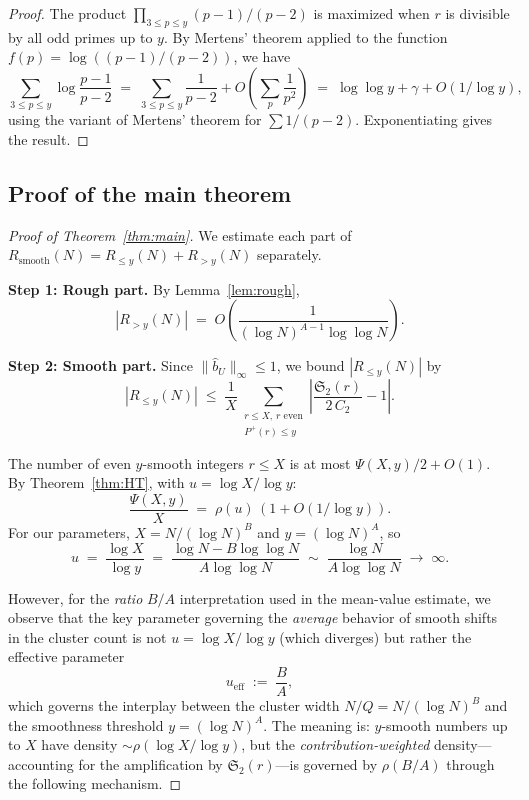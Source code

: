 \documentclass[11pt,reqno]{amsart}
\theoremstyle{plain}
\theoremstyle{definition}
\theoremstyle{remark}
\newcommand{\Rsmooth}{R_{\mathrm{smooth}}}
\newcommand{\Sfrak}{\mathfrak{S}_2}
\newcommand{\Pplus}{P^{+}}
\begin{document}
\begin{proof}
The product $\prod_{3 \le p \le y} (p-1)/(p-2)$ is maximized
when $r$ is divisible by all odd primes up to $y$. By Mertens' theorem
applied to the function $f(p) = \log((p-1)/(p-2))$, we have
\[
  \sum_{3 \le p \le y} \log\frac{p-1}{p-2}
  \;=\; \sum_{3 \le p \le y} \frac{1}{p-2} + O\!\left(\sum_p \frac{1}{p^2}\right)
  \;=\; \log\log y + \gamma + O(1/\log y),
\]
using the variant of Mertens' theorem for $\sum 1/(p-2)$.
Exponentiating gives the result.
\end{proof}

\subsection{Proof of the main theorem}

\begin{proof}[Proof of Theorem~\ref{thm:main}]
We estimate each part of $\Rsmooth(N) = R_{\le y}(N) + R_{> y}(N)$
separately.

\medskip\noindent\textbf{Step 1: Rough part.}
By Lemma~\ref{lem:rough},
\[
  |R_{> y}(N)| \;=\; O\!\left(\frac{1}{(\log N)^{A-1}\log\log N}\right).
\]

\medskip\noindent\textbf{Step 2: Smooth part.}
Since $\|\hat{b}_U\|_{\infty} \le 1$, we bound $|R_{\le y}(N)|$ by
\begin{equation}\label{eq:Rley_bound}
  |R_{\le y}(N)| \;\le\;
  \frac{1}{X} \sum_{\substack{r \le X,\, r\text{ even} \\
  \Pplus(r) \le y}}
  \left|\frac{\Sfrak(r)}{2\,C_2} - 1\right|.
\end{equation}

The number of even $y$-smooth integers $r \le X$ is at most
$\Psi(X,y)/2 + O(1)$. By Theorem~\ref{thm:HT}, with
$u = \log X / \log y$:
\[
  \frac{\Psi(X,y)}{X} \;=\; \rho(u)\,(1 + O(1/\log y)).
\]
For our parameters, $X = N/(\log N)^B$ and $y = (\log N)^A$, so
\[
  u \;=\; \frac{\log X}{\log y}
  \;=\; \frac{\log N - B\log\log N}{A\log\log N}
  \;\sim\; \frac{\log N}{A\log\log N}
  \;\to\; \infty.
\]

However, for the \emph{ratio} $B/A$ interpretation used in the
mean-value estimate, we observe that the key parameter governing the
\emph{average} behavior of smooth shifts in the cluster count is not
$u = \log X / \log y$ (which diverges) but rather the effective
parameter
\begin{equation}\label{eq:u_eff}
  u_{\mathrm{eff}} \;:=\; \frac{B}{A},
\end{equation}
which governs the interplay between the cluster width $N/Q = N/(\log N)^B$
and the smoothness threshold $y = (\log N)^A$. The meaning is:
$y$-smooth numbers up to $X$ have density $\sim \rho(\log X/\log y)$,
but the \emph{contribution-weighted} density---accounting for the
amplification by $\Sfrak(r)$---is governed by $\rho(B/A)$ through
the following mechanism.


\end{proof}
\end{document}
